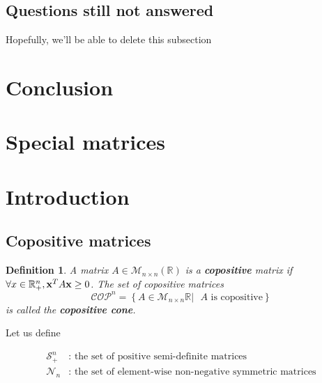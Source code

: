\documentclass[onecolumn,11pt,a4paper]{article}
\theoremstyle{plain}  %
\newtheorem{defn}[theorem]{Definition}
\theoremstyle{remark}  %
\begin{document}
\subsection{Questions still not answered}
Hopefully, we'll be able to delete this subsection \smiley{}
\label{sub:questions}
\section{Conclusion}
\appendix
\section{Special matrices }
\newpage
\normalsize
\section{Introduction}
\label{sec:introduction}
\subsection{Copositive matrices}

\begin{defn}
	A matrix $A \in \mathcal{M}_{n \times n} \left( \mathbb{R} \right)$ is a \textbf{copositive} matrix if
	$\forall x \in \mathbb{R}_+^n, \vb{x}^T A \vb{x} \ge 0$. The set of copositive matrices
	\[ \mathcal{COP}^n = \left\{ A \in \mathcal{M}_{n \times n} \mathbb{R} |
	\text{ $A$ is
		copositive}\right\} \]
	 is called the \textbf{copositive cone}.
\end{defn}

Let us define 

\begin{align*}
	\mathcal{S}_+^n & : \text{ the set of positive semi-definite matrices} \\
	\mathcal{N}_n  & : \text{ the set of element-wise non-negative symmetric matrices} \\
	\label{}
\end{align*}
\end{document}
